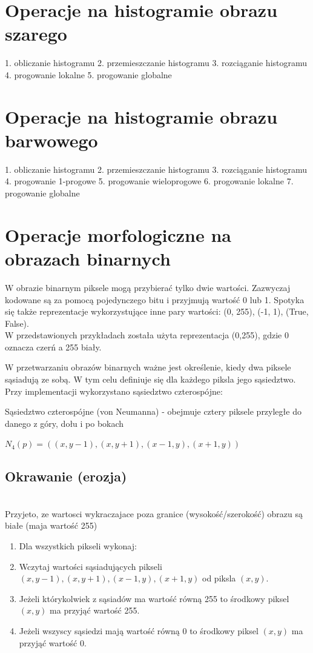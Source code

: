 \documentclass[final,a4paper,openany,12pt]{mwbk}
\begin{document}
\chapter{Operacje na histogramie obrazu szarego}
1. obliczanie histogramu
2. przemieszczanie histogramu
3. rozciąganie histogramu
4. progowanie lokalne
5. progowanie globalne

\chapter{Operacje na histogramie obrazu barwowego}
1. obliczanie histogramu
2. przemieszczanie histogramu
3. rozciąganie histogramu
4. progowanie 1-progowe
5. progowanie wieloprogowe
6. progowanie lokalne
7. progowanie globalne

\chapter{Operacje morfologiczne na obrazach binarnych}

W obrazie binarnym piksele mogą przybierać tylko dwie wartości. Zazwyczaj kodowane są za pomocą pojedynczego bitu i przyjmują wartość 0 lub 1. Spotyka się także reprezentacje wykorzystujące inne pary wartości: (0, 255), (-1, 1), (True, False). \\
W przedstawionych przykładach została użyta reprezentacja (0,255), gdzie 0 oznacza czerń a 255 biały.

W przetwarzaniu obrazów binarnych ważne jest określenie, kiedy dwa piksele sąsiadują ze sobą. W tym celu definiuje się dla każdego piksla jego sąsiedztwo. Przy implementacji wykorzystano sąsiedztwo czterospójne: 

	Sąsiedztwo czterospójne (von Neumanna) - obejmuje cztery piksele przyległe do danego z góry, dołu i po bokach
	\begin{center}
	 $N_{4}(p)=((x,y-1),(x,y+1),(x-1,y),(x+1,y))$
	 \end{center}

\section{ Okrawanie (erozja)}
\hfill\\
\indent
       Przyjeto, ze wartosci wykraczajace poza granice (wysokość/szerokość) obrazu są białe (maja wartość 255)
	\begin{enumerate}	
		\item Dla wszystkich pikseli wykonaj:
		\item Wczytaj wartości sąsiadujących pikseli $(x,y-1),(x,y+1),(x-1,y),(x+1,y)$ od piksla $(x,y)$.
		\item Jeżeli którykolwiek z sąsiadów ma wartość równą 255 to środkowy piksel $(x,y)$ ma przyjąć wartość 255. 
		\item Jeżeli wszyscy sąsiedzi mają wartość równą 0 to środkowy piksel $(x,y)$ ma przyjąć wartość 0.
	\end{enumerate}
\end{document}
